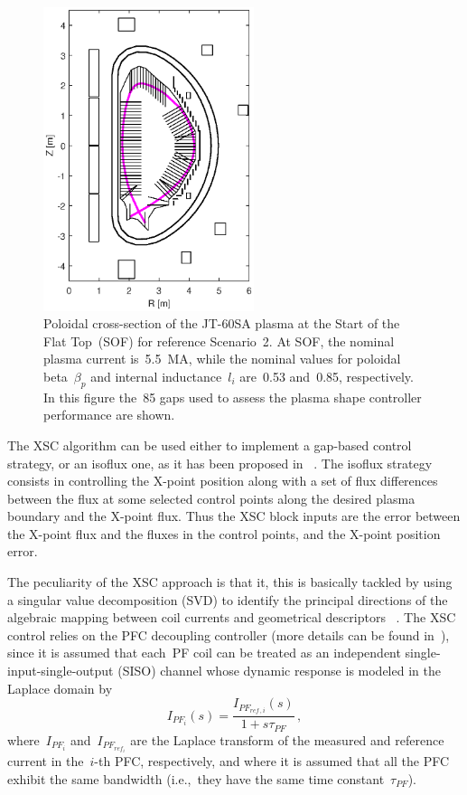  \begin{figure}[h]
 	\begin{center}
 		\includegraphics[width=0.55\textwidth]{Chp3/85_gaps_2.eps}
 	\end{center}\caption{Poloidal cross-section of the JT-60SA plasma at the Start of the Flat Top~(SOF) for reference Scenario~2. At SOF, the nominal plasma current is~5.5~MA, while the nominal values for poloidal beta~$\beta_p$ and internal inductance~$l_i$ are~0.53 and~0.85, respectively. In this figure the~85 gaps used to assess the plasma shape controller performance are shown.}\label{figure:85_gaps}
 \end{figure}
 
  The XSC algorithm can be used either to implement a gap-based control strategy, or an isoflux one, as it has been proposed in ~\cite{NCruz}. The isoflux strategy consists in controlling the X-point position along with a set of flux differences between the flux at some selected control points along the desired plasma boundary and the X-point flux. Thus the XSC block inputs are the error between the X-point flux and the fluxes in the control points, and the X-point position error.
\smallskip


The peculiarity of the XSC approach is that it, this  is basically tackled by using a singular value decomposition (SVD) to identify the principal directions of the algebraic mapping between coil currents and geometrical descriptors ~\cite{Albanese2005}. The XSC control relies on the PFC decoupling controller (more details can be found in~\cite[Section~4.4]{NCruz}), since it is assumed that each~PF coil can be treated as an independent single-input-single-output (SISO) channel whose dynamic response is modeled in the Laplace domain by
\[
I_{PF_i}(s) = \frac{I_{PF_{ref\,,i}}(s)}{1+s\tau_{PF}}\,,
\]
where~$I_{PF_i}$ and~$I_{PF_{ref_i}}$ are the Laplace transform of the measured and reference current in the~$i$-th PFC, respectively, and where it is assumed that all the PFC exhibit the same bandwidth (i.e.,~they have the same time constant~$\tau_{PF}$).
\smallskip


